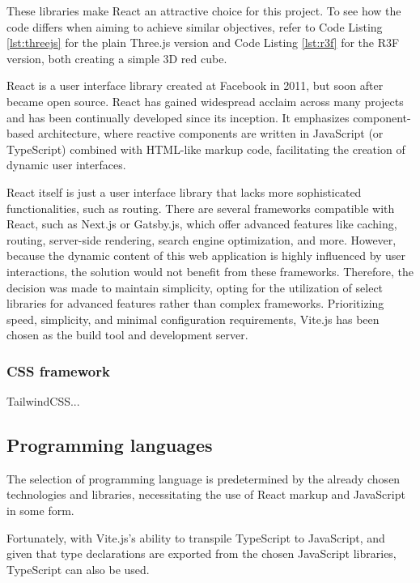 These libraries make React an attractive choice for this project. To see how the code differs when aiming to achieve similar objectives, refer to Code Listing \ref{lst:threejs} for the plain Three.js version and Code Listing \ref{lst:r3f} for the R3F version, both creating a simple 3D red cube.

React is a user interface library created at Facebook in 2011, but soon after became open source. React has gained widespread acclaim across many projects and has been continually developed since its inception. It emphasizes component-based architecture, where reactive components are written in JavaScript (or TypeScript) combined with HTML-like markup code, facilitating the creation of dynamic user interfaces. \cite{Banks2020}

React itself is just a user interface library that lacks more sophisticated functionalities, such as routing. There are several frameworks compatible with React, such as Next.js or Gatsby.js, which offer advanced features like caching, routing, server-side rendering, search engine optimization, and more. However, because the dynamic content of this web application is highly influenced by user interactions, the solution would not benefit from these frameworks. \cite{Eze2023} Therefore, the decision was made to maintain simplicity, opting for the utilization of select libraries for advanced features rather than complex frameworks. Prioritizing speed, simplicity, and minimal configuration requirements, Vite.js has been chosen as the build tool and development server. \cite{Said2023}

\subsubsection{CSS framework}

TailwindCSS...

\subsection{Programming languages}

The selection of programming language is predetermined by the already chosen technologies and libraries, necessitating the use of React markup and JavaScript in some form.

Fortunately, with Vite.js's ability to transpile TypeScript to JavaScript, and given that type declarations are exported from the chosen JavaScript libraries, TypeScript can also be used. \cite{Said2023}

